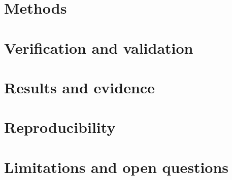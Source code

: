 \documentclass[
  aps, prx,            %
  reprint,             %
  amsmath, amssymb,    %
  nofootinbib,
  superscriptaddress,
]{revtex4-2}
\begin{document}
\section{Methods}\label{sec:methods}

\section{Verification and validation}\label{sec:verify}

\section{Results and evidence}\label{sec:results}


\section{Reproducibility}\label{sec:repro}

\section{Limitations and open questions}\label{sec:limits}


\end{document}
